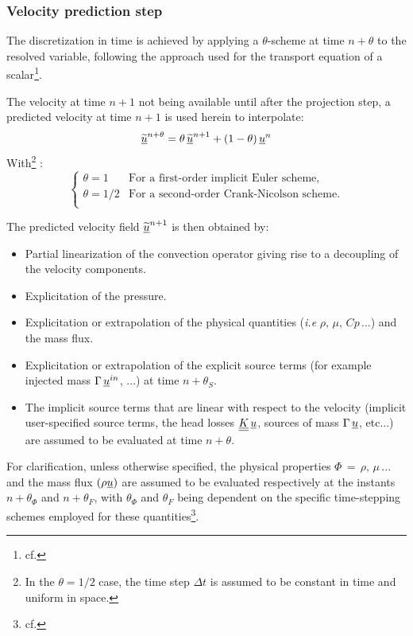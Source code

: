 \subsubsection*{Velocity prediction step}
The discretization in time is achieved by applying a $\theta$-scheme
at time $n+\theta$ to the resolved variable, following the approach used
for the transport equation of a scalar\footnote{cf. }.

The velocity at time $n+1$ not being available until after the projection
step, a predicted velocity at time $n+1$ is used herein to interpolate:
\begin{equation}
\label{eq:navstv:theta_scheme}
\underline{\widetilde{u}}^{n+\theta} = \theta\, {\underline{\widetilde{u}}}^{n+1}+(1-\theta)\, \underline{u}^{n}
\end{equation}
With\footnote{In the $\theta = 1/2$ case, the time step $\Delta t$ is assumed
to be constant in time and uniform in space.} :
\begin{equation}
\left\{
\begin{array}{ll}
\theta = 1   & \text{For a first-order implicit Euler scheme,}\\
\theta = 1/2 & \text{For a second-order Crank-Nicolson scheme.}\\
\end{array}
\right.
\end{equation}

The predicted velocity field ${\underline{\widetilde{u}}^{n+1}}$ is then
obtained by:

\begin{itemize}
\item Partial linearization of the convection operator giving rise to a
decoupling of the velocity components.
\item Explicitation of the pressure.
\item Explicitation or extrapolation of the physical quantities (\emph{i.e}
$\rho,\,\mu,\,Cp\,...$) and the mass flux.
\item Explicitation or extrapolation of the explicit source terms
(for example
injected mass $\Gamma\,\underline{u}^{in}$, ...)
at time $n+\theta_{S}$.
\item The implicit source terms that are linear with respect to the velocity
(implicit user-specified source terms, the head losses
$\underline{\underline{K}}\,\underline{u}$, sources of mass $\Gamma\,\underline{u}$, etc...)
are assumed to be evaluated at time $n+\theta$.
\end{itemize}

For clarification, unless otherwise specified, the physical properties
$\Phi\,=\,\rho,\,\mu\,...$ and the mass flux $(\rho\underline{u})$ are assumed
to be evaluated respectively at the instants $n+\theta_\Phi$ and
$n+\theta_F$, with $\theta_\Phi$ and $\theta_F$ being dependent on the
specific time-stepping schemes employed for these
quantities\footnote{cf. }.

